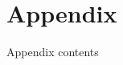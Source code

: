 
\section{Appendix}

Appendix contents

\inputminted{cpp}{./code/P15601_en_Harrichu_y_and_the_maze.cc}
